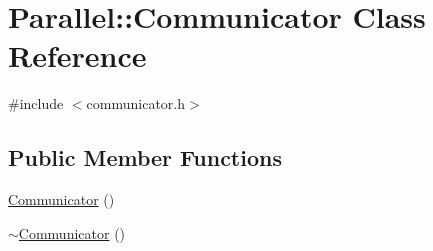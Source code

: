 \hypertarget{class_parallel_1_1_communicator}{}\section{Parallel\+::Communicator Class Reference}
\label{class_parallel_1_1_communicator}


{\ttfamily \#include $<$communicator.\+h$>$}

\subsection*{Public Member Functions}
\begin{DoxyCompactItemize}
\item 
\mbox{\hyperlink{class_parallel_1_1_communicator_abd4c26c6a901e571bc9cfc4259e65de3}{Communicator}} ()
\item 
\mbox{\hyperlink{class_parallel_1_1_communicator_a4ced5362bf7438924f8d7f1b0c5ec391}{$\sim$\+Communicator}} ()
\end{DoxyCompactItemize}
